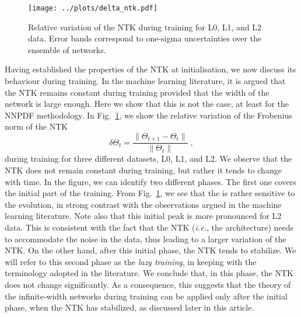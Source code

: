 \begin{figure}[h!]
  \centering
  \texttt{[image: ../plots/delta\_ntk.pdf]}
  \caption{Relative variation of the NTK during training for L0, L1, and L2
  data. Error bands correspond to one-sigma uncertainties over the ensemble of
  networks.}
  \label{fig:NTKTime}
\end{figure}
Having established the properties of the NTK at initialisation, we now discuss
its behaviour during training. In the machine learning literature, it is argued
that the NTK remains constant during training provided that the width of the
network is large enough. Here we show that this is not the case, at least for
the NNPDF methodology. In Fig.~\ref{fig:NTKTime}, we show the relative variation
of the Frobenius norm of the NTK
\begin{equation}
\delta \Theta_t = \frac{\lVert \Theta_{t+1} - \Theta_t \rVert}{\lVert \Theta_t \rVert} \;,
\label{eq:DeltaNTK}
\end{equation}
during training for three different datasets, L0, L1, and L2. We observe that
the NTK does not remain constant during training, but rather it tends to change
with time. In the figure, we can identify two different phases. The first one
covers the initial part of the training. From Fig.~\ref{fig:NTKTime}, we see
that the is rather sensitive to the evolution, in strong contrast with the
observations argued in the machine learning literature. Note also that this
initial peak is more pronounced for L2 data. This is consistent with the fact
that the NTK (\textit{i.e.}, the architecture) needs to accommodate the noise in
the data, thus leading to a larger variation of the NTK. On the other hand,
after this initial phase, the NTK tends to stabilize. We will refer to this
second phase as the \textit{lazy training}, in keeping with the terminology
adopted in the literature. We conclude that, in this phase, the NTK does not
change significantly. As a consequence, this suggests that the theory of the
infinite-width networks during training can be applied only after the initial
phase, when the NTK has stabilized, as discussed later in this article.


